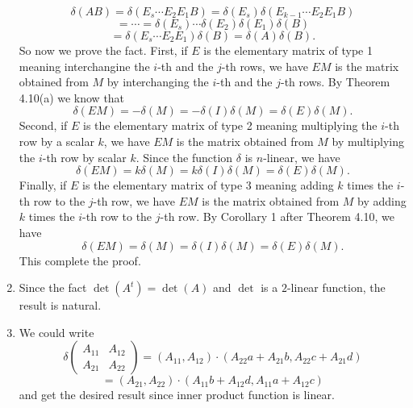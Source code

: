 \begin{enumerate}
\[\delta(AB)=\delta(E_s\cdots E_2E_1B)=\delta(E_s)\delta(E_{k-1}\cdots E_2E_1B)\]
\[=\cdots =\delta(E_s)\cdots \delta(E_2)\delta(E_1)\delta(B)\]
\[=\delta(E_s\cdots E_2E_1)\delta(B)=\delta(A)\delta(B).\]
So now we prove the fact. First, if $E$ is the elementary matrix of type 1 meaning interchangine the $i$-th and the $j$-th rows, we have $EM$ is the matrix obtained from $M$ by interchanging the $i$-th and the $j$-th rows. By Theorem 4.10(a) we know that 
\[\delta(EM)=-\delta(M)=-\delta(I)\delta(M)=\delta(E)\delta(M).\]
Second, if $E$ is the elementary matrix of type 2 meaning multiplying the $i$-th row by a scalar $k$, we have $EM$ is the matrix obtained from $M$ by multiplying the $i$-th row by scalar $k$. Since the function $\delta$ is $n$-linear, we have 
\[\delta(EM)=k\delta(M)=k\delta(I)\delta(M)=\delta(E)\delta(M).\]
Finally, if $E$ is the elementary matrix of type 3 meaning adding $k$ times the $i$-th row to the $j$-th row, we have $EM$ is the matrix obtained from $M$ by adding $k$ times the $i$-th row to the $j$-th row. By Corollary 1 after Theorem 4.10, we have 
\[\delta(EM)=\delta(M)=\delta(I)\delta(M)=\delta(E)\delta(M).\]
This complete the proof.
\item Since the fact $\det(A^t)=\det(A)$ and $\det $ is a $2$-linear function, the result is natural.
\item We could write 
\[\delta\begin{pmatrix}A_{11}&A_{12}\\A_{21}&A_{22}\end{pmatrix}=(A_{11},A_{12})\cdot (A_{22}a+A_{21}b,A_{22}c+A_{21}d)\]
\[=(A_{21},A_{22})\cdot (A_{11}b+A_{12}d,A_{11}a+A_{12}c)\]
and get the desired result since inner product function is linear.


\end{enumerate}
